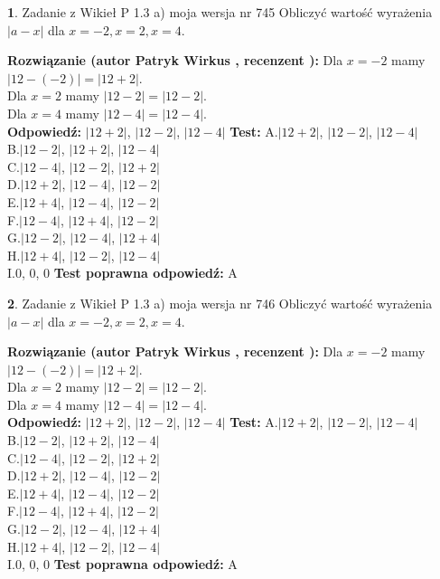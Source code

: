 \documentclass[12pt, a4paper]{article}
\theoremstyle{definition} %
\newtheorem{zad}{}
\newcommand{\zadStart}[1]{\begin{zad}#1\newline}
\newcommand{\zadStop}{\end{zad}}
\newcommand{\rozwStart}[2]{\noindent \textbf{Rozwiązanie (autor #1 , recenzent #2): }\newline}
\newcommand{\rozwStop}{\newline}
\newcommand{\odpStart}{\noindent \textbf{Odpowiedź:}\newline}
\newcommand{\odpStop}{\newline}
\newcommand{\testStart}{\noindent \textbf{Test:}\newline}
\newcommand{\testStop}{\newline}
\newcommand{\kluczStart}{\noindent \textbf{Test poprawna odpowiedź:}\newline}
\newcommand{\kluczStop}{\newline}
\begin{document}
\zadStart{Zadanie z Wikieł P 1.3 a) moja wersja nr 745}
Obliczyć wartość wyrażenia $|a - x|$ dla $x=-2,x=2,x=4$.
\zadStop
\rozwStart{Patryk Wirkus}{}
Dla $x = -2$ mamy $|12 - (-2)| = |12 + 2|$.\\
Dla $x = 2$ mamy $|12 - 2| = |12 - 2|$.\\
Dla $x = 4$ mamy $|12 - 4| = |12 - 4|$.\\
\rozwStop
\odpStart
$|12 + 2|$, $|12 - 2|$, $|12 - 4|$
\odpStop
\testStart
A.$|12 + 2|$, $|12 - 2|$, $|12 - 4|$\\
B.$|12 - 2|$, $|12 + 2|$, $|12 - 4|$\\
C.$|12 - 4|$, $|12 - 2|$, $|12 + 2|$\\
D.$|12 + 2|$, $|12 - 4|$, $|12 - 2|$\\
E.$|12 + 4|$, $|12 - 4|$, $|12 - 2|$\\
F.$|12 - 4|$, $|12 + 4|$, $|12 - 2|$\\
G.$|12 - 2|$, $|12 - 4|$, $|12 + 4|$\\
H.$|12 + 4|$, $|12 - 2|$, $|12 - 4|$\\
I.$0$, $0$, $0$
\testStop
\kluczStart
A
\kluczStop



\zadStart{Zadanie z Wikieł P 1.3 a) moja wersja nr 746}
Obliczyć wartość wyrażenia $|a - x|$ dla $x=-2,x=2,x=4$.
\zadStop
\rozwStart{Patryk Wirkus}{}
Dla $x = -2$ mamy $|12 - (-2)| = |12 + 2|$.\\
Dla $x = 2$ mamy $|12 - 2| = |12 - 2|$.\\
Dla $x = 4$ mamy $|12 - 4| = |12 - 4|$.\\
\rozwStop
\odpStart
$|12 + 2|$, $|12 - 2|$, $|12 - 4|$
\odpStop
\testStart
A.$|12 + 2|$, $|12 - 2|$, $|12 - 4|$\\
B.$|12 - 2|$, $|12 + 2|$, $|12 - 4|$\\
C.$|12 - 4|$, $|12 - 2|$, $|12 + 2|$\\
D.$|12 + 2|$, $|12 - 4|$, $|12 - 2|$\\
E.$|12 + 4|$, $|12 - 4|$, $|12 - 2|$\\
F.$|12 - 4|$, $|12 + 4|$, $|12 - 2|$\\
G.$|12 - 2|$, $|12 - 4|$, $|12 + 4|$\\
H.$|12 + 4|$, $|12 - 2|$, $|12 - 4|$\\
I.$0$, $0$, $0$
\testStop
\kluczStart
A
\kluczStop
\end{document}
